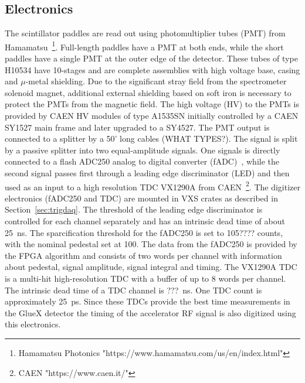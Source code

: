 \subsection{Electronics \label{sec:scelectronics}}
The scintillator paddles are read out using 
photomultiplier tubes (PMT) from Hamamatsu~\footnote{Hamamatsu Photonics "https://www.hamamatsu.com/us/en/index.html"}. Full-length paddles
have a PMT at both ends, while the short paddles have a single PMT
at the outer edge of the detector. These tubes of type H10534 have 10-stages and are complete assemblies with high voltage base, casing and $\mu$-metal shielding. Due to the significant stray field from the spectrometer solenoid magnet, additional external
shielding based on soft iron is necessary to protect the PMTs from the magnetic field.
The high voltage (HV) to the PMTs is provided by CAEN HV modules of type A1535SN initially controlled by a CAEN SY1527 main frame and
later upgraded to a SY4527.
The PMT output is connected to a splitter by a 50' long cables (WHAT TYPES?). The signal is split by
a passive splitter into two equal-amplitude signals. One signals is directly connected to a flash ADC250
analog to digital converter (fADC)~\cite{Dong:2007}, while the second signal passes first through a leading edge discriminator (LED) and then used as an input to a high resolution TDC VX1290A from CAEN~\footnote{CAEN "https://www.caen.it/"}. The digitizer electronics (fADC250 and TDC) are mounted in VXS crates as described in Section~\ref{sec:trigdaq}.
The threshold of the leading edge discriminator is controlled for each channel separately and has an intrinsic
dead time of about 25~ns.
The sparcification threshold for the fADC250 is set to 105???? counts, with the nominal pedestal set at 100. The data from the fADC250 is provided by the FPGA algorithm and consists
of two words per channel with information about pedestal, signal amplitude, signal integral and timing.
The VX1290A TDC is a multi-hit high-resolution TDC with a buffer of 
up to 8 words per channel. The intrinsic dead time of a TDC channel is ???~ns. One TDC count is approximately 25~ps.
Since these TDCs provide the best time measurements in the GlueX detector the timing of the accelerator RF signal is also
digitized using this electronics.


